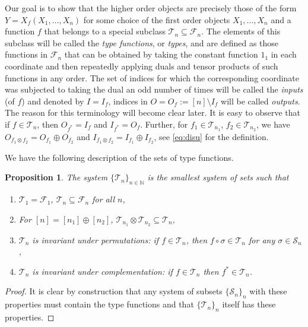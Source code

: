 \documentclass[12pt]{article}
\newtheorem{prop}{Proposition}
\theoremstyle{definition}
\theoremstyle{remark}
\def\Te{\mathcal T}
\def\Fe{\mathcal F}
\def\Se {\mathcal S}
\def\permut{\mathscr{S}}
\begin{document}
Our goal is to show that the higher order objects are precisely those of the form
$Y=X_f(X_1,\dots,X_n)$ for some choice of the
first order objects $X_1,\dots, X_n$ and a function $f$ that belongs to a special subclass
 $\Te_n\subseteq \Fe_n$. The elements of this subclass will be called the {\em type
 functions},
 or {\em types}, and are defined as those functions in $\Fe_n$ that can be obtained by taking
 the constant function $1_1$ in each coordinate and then repeatedly applying duals and tensor
 products of such functions in any order. The set of indices for which the corresponding
 coordinate  was subjected to taking the dual an odd  number of times will be called the
{\em inputs} (of $f$) and denoted by $I=I_f$, indices  in $O=O_f:=[n]\setminus I_f$ will be
called {\em outputs}. The reason for this terminology will become clear later. It is easy to observe that if $f\in \Te_n$, then $O_{f^*}=I_f$ and $I_{f^*}=O_f$. Further,
for $f_1\in \Te_{n_1}$, $f_2\in \Te_{n_2}$, we have $O_{f_1\otimes f_2}=O_{f_1}\oplus
O_{f_2}$ and  $I_{f_1\otimes f_2}=I_{f_1}\oplus
I_{f_2}$, see \eqref{eq:disu} for the definition.

We have the following  description of the sets of type functions.

\begin{prop}\label{prop:type_min} The system  $\{\Te_n\}_{n\in \mathbb N}$ is the smallest
system of sets such that
\begin{enumerate}
\item $\Te_1=\Fe_1$, $\Te_n\subseteq \Fe_n$ for all $n$,

\item For $[n]=[n_1]\oplus [n_2]$, $\Te_{n_1}\otimes \Te_{n_2}\subseteq \Te_{n}$,
\item $\Te_n$  is invariant under permutations: if $f\in \Te_n$, then $f\circ \sigma\in
\Te_n$ for any $\sigma\in \permut_n$,
\item $\Te_n$  is invariant under complementation: if $f\in \Te_n$ then $f^*\in \Te_n$.

\end{enumerate}

\end{prop}


\begin{proof} It is clear by construction that any system of subsets $\{\Se_n\}_n$ with
these properties must contain the type functions and that $\{\Te_n\}_n$ itself has these
properties.

\end{proof}
\end{document}
